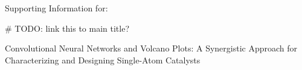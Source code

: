 Supporting Information for:

# TODO: link this to main title?

Convolutional Neural Networks and Volcano Plots: A Synergistic Approach for Characterizing and Designing Single-Atom Catalysts
